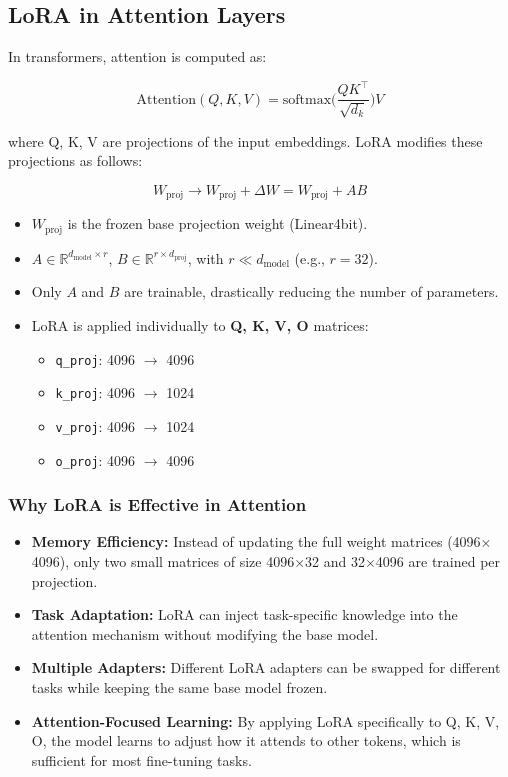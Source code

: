 \subsection{LoRA in Attention Layers}

In transformers, attention is computed as:

\[
\text{Attention}(Q,K,V) = \text{softmax}\Big(\frac{Q K^\top}{\sqrt{d_k}}\Big) V
\]

where Q, K, V are projections of the input embeddings. LoRA modifies these projections as follows:

\[
W_{\text{proj}} \rightarrow W_{\text{proj}} + \Delta W = W_{\text{proj}} + A B
\]

\begin{itemize}
    \item $W_{\text{proj}}$ is the frozen base projection weight (Linear4bit).
    \item $A \in \mathbb{R}^{d_{\text{model}} \times r}$, $B \in \mathbb{R}^{r \times d_{\text{proj}}}$, with $r \ll d_{\text{model}}$ (e.g., $r=32$).  
    \item Only $A$ and $B$ are trainable, drastically reducing the number of parameters.
    \item LoRA is applied individually to \textbf{Q, K, V, O} matrices:
        \begin{itemize}
            \item \texttt{q\_proj}: 4096 $\rightarrow$ 4096
            \item \texttt{k\_proj}: 4096 $\rightarrow$ 1024
            \item \texttt{v\_proj}: 4096 $\rightarrow$ 1024
            \item \texttt{o\_proj}: 4096 $\rightarrow$ 4096
        \end{itemize}
\end{itemize}

\subsubsection{Why LoRA is Effective in Attention}

\begin{itemize}
    \item \textbf{Memory Efficiency:} Instead of updating the full weight matrices (4096$\times$4096), only two small matrices of size 4096$\times$32 and 32$\times$4096 are trained per projection.
    \item \textbf{Task Adaptation:} LoRA can inject task-specific knowledge into the attention mechanism without modifying the base model.
    \item \textbf{Multiple Adapters:} Different LoRA adapters can be swapped for different tasks while keeping the same base model frozen.
    \item \textbf{Attention-Focused Learning:} By applying LoRA specifically to Q, K, V, O, the model learns to adjust how it attends to other tokens, which is sufficient for most fine-tuning tasks.
\end{itemize}

